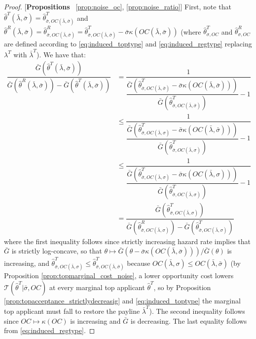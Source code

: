 \begin{proof}{[\textbf{Propositions} ~\ref{prop:noise_oc}, \ref{prop:noise_ratio}]}
\noindent First, note that $\hat{\theta}^T(\bar{\lambda},\bar{\sigma}) = \hat\theta^T_{\bar{\sigma},OC(\bar{\lambda},\bar{\sigma})}$ and $\hat{\theta}^R(\bar{\lambda},\bar{\sigma}) = \hat{\theta}^R_{\bar{\sigma},OC(\bar{\lambda},\bar{\sigma})} = \hat{\theta}^T_{\bar{\sigma},OC(\bar{\lambda},\bar{\sigma})} - \bar{\sigma}\kappa(OC(\bar{\lambda},\bar{\sigma}))$ (where $\hat{\theta}^T_{\sigma,OC}$ and $\hat{\theta}^R_{\sigma,OC}$ are defined according to \eqref{eq:induced_toptype} and \eqref{eq:induced_regtype} replacing $\lambda^T$ with $\bar{\lambda}^T$). We have that:
\begin{align*}
    \dfrac{\bar{G}(\hat{\theta}^T(\bar{\lambda},\bar{\sigma}) )}{\bar{G}(\hat{\theta}^R(\bar{\lambda},\bar{\sigma}) ) - \bar{G}(\hat{\theta}^T(\bar{\lambda},\bar{\sigma}) )} &= \dfrac{1}{\dfrac{\bar{G}(\hat{\theta}^T_{\bar{\sigma},OC(\bar{\lambda},\bar{\sigma})}-\bar{\sigma}\kappa(OC(\bar{\lambda},\bar{\sigma})))}{\bar{G}(\hat{\theta}^T_{\bar{\sigma},OC(\bar{\lambda},\bar{\sigma})})} - 1} \\
    &\leq \dfrac{1}{\dfrac{\bar{G}(\hat{\theta}^T_{\bar{\sigma},OC(\bar{\lambda},\sigma)}-\bar{\sigma}\kappa(OC(\bar{\lambda},\bar{\sigma})))}{\bar{G}(\hat{\theta}^T_{\bar{\sigma},OC(\bar{\lambda},\sigma)})} - 1} \\
    &\leq \dfrac{1}{\dfrac{\bar{G}(\hat{\theta}^T_{\bar{\sigma},OC(\bar{\lambda},\sigma)}-\bar{\sigma}\kappa(OC(\bar{\lambda},\sigma)))}{\bar{G}(\hat{\theta}^T_{\bar{\sigma},OC(\bar{\lambda},\sigma)})} - 1} \\
    &= \dfrac{\bar{G}(\hat{\theta}^T_{\bar{\sigma},OC(\bar{\lambda},\sigma)})}{\bar{G}(\hat{\theta}^R_{\bar{\sigma},OC(\bar{\lambda},\sigma)}) - \bar{G}(\hat{\theta}^T_{\bar{\sigma},OC(\bar{\lambda},\sigma)})}
\end{align*}
where the first inequality follows since strictly increasing hazard rate implies that $\bar{G}$ is strictly log-concave, so that $\theta\mapsto \bar{G}(\theta-\bar{\sigma}\kappa(OC(\bar{\lambda},\bar{\sigma})))/\bar{G}(\theta)$ is increasing, and $\hat{\theta}^T_{\bar{\sigma},OC(\bar{\lambda},\sigma)}\leq \hat{\theta}^T_{\bar{\sigma},OC(\bar{\lambda},\bar{\sigma})}$ because $OC(\bar{\lambda},\sigma)\leq OC(\bar{\lambda},\bar{\sigma})$ (by Proposition \ref{prop:topmarginal_cost_noise}, a lower opportunity cost lowers $\mathcal{T}(\hat{\theta}^T|\bar{\sigma},OC)$ at every marginal top applicant $\hat{\theta}^T$, so by Proposition \ref{prop:topacceptance_strictlydecreasig} and \eqref{eq:induced_toptype} the marginal top applicant must fall to restore the payline $\bar{\lambda}^T$). The second inequality follows since $OC\mapsto\kappa(OC)$ is increasing and $\bar{G}$ is decreasing. The last equality follows from \eqref{eq:induced_regtype}.


\end{proof}
